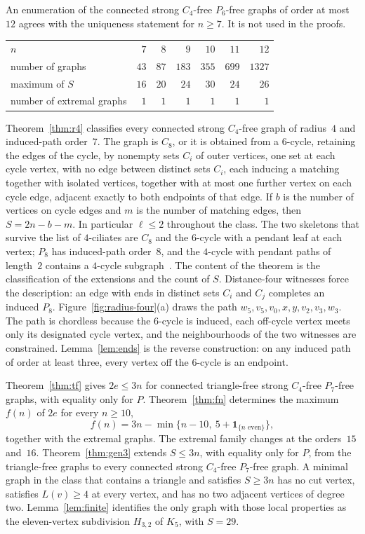 \documentclass[ASNA]{USG}
\theoremstyle{WBstyletwo}
\numberwithin{equation}{section}
\newcommand{\lr}{\ell}
\begin{document}
An enumeration of the connected strong $C_4$-free $P_6$-free graphs of order at most~$12$ agrees with the uniqueness statement for $n\ge 7$. It is not used in the proofs.
\begin{center}
\begin{tabular}{@{}lrrrrrr@{}}
\toprule
$n$ & $7$ & $8$ & $9$ & $10$ & $11$ & $12$\\
number of graphs & $43$ & $87$ & $183$ & $355$ & $699$ & $1327$\\
maximum of $S$ & $16$ & $20$ & $24$ & $30$ & $24$ & $26$\\
number of extremal graphs & $1$ & $1$ & $1$ & $1$ & $1$ & $1$\\
\bottomrule
\end{tabular}
\end{center}

Theorem~\ref{thm:r4} classifies every connected strong $C_4$-free graph of radius~$4$ and induced-path order~$7$. The graph is $C_8$, or it is obtained from a $6$-cycle, retaining the edges of the cycle, by nonempty sets $C_i$ of outer vertices, one set at each cycle vertex, with no edge between distinct sets $C_i$, each inducing a matching together with isolated vertices, together with at most one further vertex on each cycle edge, adjacent exactly to both endpoints of that edge. If $b$ is the number of vertices on cycle edges and $m$ is the number of matching edges, then $S=2n-b-m$. In particular $\lr\le 2$ throughout the class. The two skeletons that survive the list of $4$-ciliates are $C_8$ and the $6$-cycle with a pendant leaf at each vertex; $P_8$ has induced-path order~$8$, and the $4$-cycle with pendant paths of length~$2$ contains a $4$-cycle subgraph~\cite{fajtlowicz,dlpw}. The content of the theorem is the classification of the extensions and the count of $S$. Distance-four witnesses force the description: an edge with ends in distinct sets $C_i$ and $C_j$ completes an induced $P_8$. Figure~\ref{fig:radius-four}(a) draws the path $w_5,v_5,v_0,x,y,v_2,v_3,w_3$. The path is chordless because the $6$-cycle is induced, each off-cycle vertex meets only its designated cycle vertex, and the neighbourhoods of the two witnesses are constrained. Lemma~\ref{lem:ends} is the reverse construction: on any induced path of order at least three, every vertex off the $6$-cycle is an endpoint.

Theorem~\ref{thm:tf} gives $2e\le 3n$ for connected triangle-free strong $C_4$-free $P_7$-free graphs, with equality only for $P$. Theorem~\ref{thm:fn} determines the maximum $f(n)$ of $2e$ for every $n\ge 10$,
\[
f(n)=3n-\min\bigl\{n-10,\ 5+\mathbf{1}_{\{n\text{ even}\}}\bigr\},
\]
together with the extremal graphs. The extremal family changes at the orders~$15$ and~$16$. Theorem~\ref{thm:gen3} extends $S\le 3n$, with equality only for $P$, from the triangle-free graphs to every connected strong $C_4$-free $P_7$-free graph. A minimal graph in the class that contains a triangle and satisfies $S\ge 3n$ has no cut vertex, satisfies $L(v)\ge 4$ at every vertex, and has no two adjacent vertices of degree two. Lemma~\ref{lem:finite} identifies the only graph with those local properties as the eleven-vertex subdivision $H_{3,2}$ of $K_5$, with $S=29$.
\end{document}
